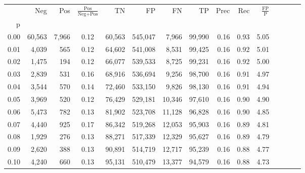 \begin{tabular}{rrrcrrrrrrrrrrr}
\toprule
{} &     Neg &     Pos & $\frac{\text{Pos}}{\text{Neg}+\text{Pos}}$ &       TN &       FP &       FN &      TP &  Prec &   Rec & $\frac{\text{FP}}{\text{P}}$ \\
p    &         &         &                                            &          &          &          &         &       &       &                              \\
\midrule
0.00 &  60,563 &   7,966 &                                       0.12 &   60,563 &  545,047 &    7,966 &  99,990 &  0.16 &  0.93 &                         5.05 \\
0.01 &   4,039 &     565 &                                       0.12 &   64,602 &  541,008 &    8,531 &  99,425 &  0.16 &  0.92 &                         5.01 \\
0.02 &   1,475 &     194 &                                       0.12 &   66,077 &  539,533 &    8,725 &  99,231 &  0.16 &  0.92 &                         5.00 \\
0.03 &   2,839 &     531 &                                       0.16 &   68,916 &  536,694 &    9,256 &  98,700 &  0.16 &  0.91 &                         4.97 \\
0.04 &   3,544 &     570 &                                       0.14 &   72,460 &  533,150 &    9,826 &  98,130 &  0.16 &  0.91 &                         4.94 \\
0.05 &   3,969 &     520 &                                       0.12 &   76,429 &  529,181 &   10,346 &  97,610 &  0.16 &  0.90 &                         4.90 \\
0.06 &   5,473 &     782 &                                       0.13 &   81,902 &  523,708 &   11,128 &  96,828 &  0.16 &  0.90 &                         4.85 \\
0.07 &   4,440 &     925 &                                       0.17 &   86,342 &  519,268 &   12,053 &  95,903 &  0.16 &  0.89 &                         4.81 \\
0.08 &   1,929 &     276 &                                       0.13 &   88,271 &  517,339 &   12,329 &  95,627 &  0.16 &  0.89 &                         4.79 \\
0.09 &   2,620 &     388 &                                       0.13 &   90,891 &  514,719 &   12,717 &  95,239 &  0.16 &  0.88 &                         4.77 \\
0.10 &   4,240 &     660 &                                       0.13 &   95,131 &  510,479 &   13,377 &  94,579 &  0.16 &  0.88 &                         4.73 \\

\end{tabular}
